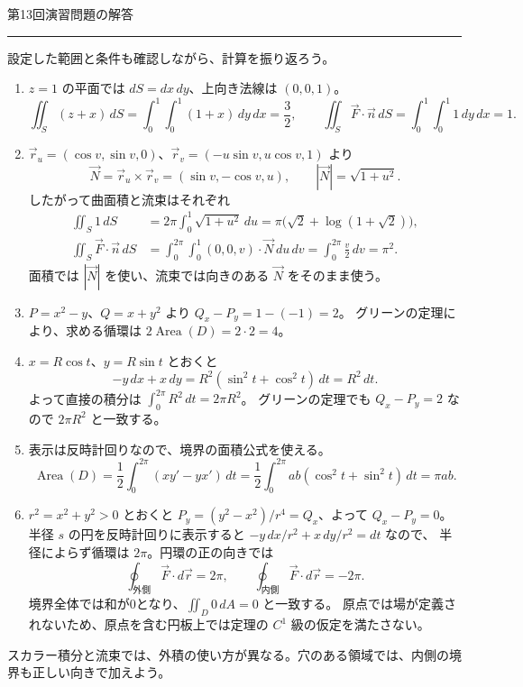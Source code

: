 \documentclass[a4paper,10pt,pdflatex,ja=standard,jafont=ipaex-type1,
  magstyle=real,scale=1]{bxjsarticle}
\newcommand{\handouttitle}[1]{%
  \begin{center}
    {\Large\color{ink}#1}\par\vspace{3mm}
    {\color{accent}\rule{0.88\linewidth}{0.7pt}}
  \end{center}\vspace{-2mm}}
\newcommand{\keybox}[1]{\par\vspace{3pt}\begingroup
  \setlength{\fboxsep}{4pt}%
  \colorbox{soft}{\parbox{\dimexpr\linewidth-2\fboxsep\relax}{\small #1}}%
  \endgroup\par\vspace{2pt}}
\newenvironment{problems}
  {\begin{enumerate}[leftmargin=2em,itemsep=3pt,topsep=3pt,parsep=0pt,
    font=\color{accent}]}
  {\end{enumerate}}
\begin{document}
\newpage
\handouttitle{第13回\quad 演習問題の解答}
{\small 設定した範囲と条件も確認しながら、計算を振り返ろう。}\par
\begin{problems}
\setlength{\itemsep}{7pt}
\item $z=1$ の平面では $dS=dx\,dy$、上向き法線は $(0,0,1)$。
$$
 \iint_S(z+x)\,dS=\int_0^1\int_0^1(1+x)\,dy\,dx=\frac32,\qquad
 \iint_S\vec F\cdot\vec n\,dS=\int_0^1\int_0^1 1\,dy\,dx=1.
$$

\item $\vec r_u=(\cos v,\sin v,0)$、$\vec r_v=(-u\sin v,u\cos v,1)$ より
$$
 \vec N=\vec r_u\times\vec r_v=(\sin v,-\cos v,u),\qquad |\vec N|=\sqrt{1+u^2}.
$$
したがって曲面積と流束はそれぞれ
$$
 \begin{aligned}
 \iint_S1\,dS
 &=2\pi\int_0^1\sqrt{1+u^2}\,du
 =\pi\bigl(\sqrt2+\log(1+\sqrt2)\bigr),\\
 \iint_S\vec F\cdot\vec n\,dS
 &=\int_0^{2\pi}\int_0^1 (0,0,v)\cdot\vec N\,du\,dv
 =\int_0^{2\pi}\frac v2\,dv=\pi^2.
 \end{aligned}
$$
面積では $|\vec N|$ を使い、流束では向きのある $\vec N$ をそのまま使う。

\item $P=x^2-y$、$Q=x+y^2$ より $Q_x-P_y=1-(-1)=2$。
グリーンの定理により、求める循環は $2\operatorname{Area}(D)=2\cdot2=4$。

\item $x=R\cos t$、$y=R\sin t$ とおくと
$$
 -y\,dx+x\,dy=R^2(\sin^2t+\cos^2t)\,dt=R^2\,dt.
$$
よって直接の積分は $\int_0^{2\pi}R^2\,dt=2\pi R^2$。
グリーンの定理でも $Q_x-P_y=2$ なので $2\pi R^2$ と一致する。

\item 表示は反時計回りなので、境界の面積公式を使える。
$$
 \operatorname{Area}(D)=\frac12\int_0^{2\pi}(x y'-y x')\,dt
 =\frac12\int_0^{2\pi}ab(\cos^2t+\sin^2t)\,dt=\pi ab.
$$

\item $r^2=x^2+y^2>0$ とおくと
$P_y=(y^2-x^2)/r^4=Q_x$、よって $Q_x-P_y=0$。
半径 $s$ の円を反時計回りに表示すると $-y\,dx/r^2+x\,dy/r^2=dt$ なので、
半径によらず循環は $2\pi$。円環の正の向きでは
$$
 \oint_{\text{外側}}\vec F\cdot d\vec r=2\pi,\qquad
 \oint_{\text{内側}}\vec F\cdot d\vec r=-2\pi.
$$
境界全体では和が0となり、$\iint_D0\,dA=0$ と一致する。
原点では場が定義されないため、原点を含む円板上では定理の $C^1$ 級の仮定を満たさない。
\end{problems}
\keybox{スカラー積分と流束では、外積の使い方が異なる。穴のある領域では、内側の境界も正しい向きで加えよう。}
\end{document}
